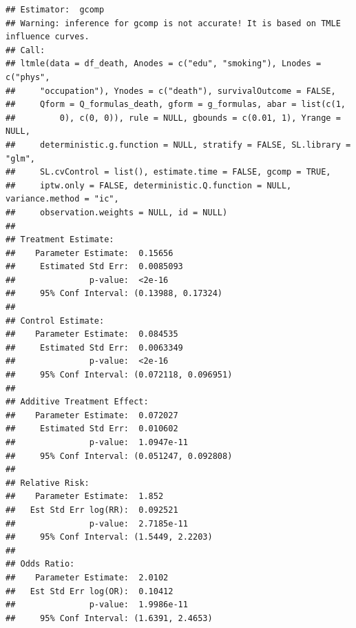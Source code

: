 \documentclass[
]{book}
\begin{document}
\begin{verbatim}
## Estimator:  gcomp 
## Warning: inference for gcomp is not accurate! It is based on TMLE influence curves.
## Call:
## ltmle(data = df_death, Anodes = c("edu", "smoking"), Lnodes = c("phys", 
##     "occupation"), Ynodes = c("death"), survivalOutcome = FALSE, 
##     Qform = Q_formulas_death, gform = g_formulas, abar = list(c(1, 
##         0), c(0, 0)), rule = NULL, gbounds = c(0.01, 1), Yrange = NULL, 
##     deterministic.g.function = NULL, stratify = FALSE, SL.library = "glm", 
##     SL.cvControl = list(), estimate.time = FALSE, gcomp = TRUE, 
##     iptw.only = FALSE, deterministic.Q.function = NULL, variance.method = "ic", 
##     observation.weights = NULL, id = NULL)
## 
## Treatment Estimate:
##    Parameter Estimate:  0.15656 
##     Estimated Std Err:  0.0085093 
##               p-value:  <2e-16 
##     95% Conf Interval: (0.13988, 0.17324) 
## 
## Control Estimate:
##    Parameter Estimate:  0.084535 
##     Estimated Std Err:  0.0063349 
##               p-value:  <2e-16 
##     95% Conf Interval: (0.072118, 0.096951) 
## 
## Additive Treatment Effect:
##    Parameter Estimate:  0.072027 
##     Estimated Std Err:  0.010602 
##               p-value:  1.0947e-11 
##     95% Conf Interval: (0.051247, 0.092808) 
## 
## Relative Risk:
##    Parameter Estimate:  1.852 
##   Est Std Err log(RR):  0.092521 
##               p-value:  2.7185e-11 
##     95% Conf Interval: (1.5449, 2.2203) 
## 
## Odds Ratio:
##    Parameter Estimate:  2.0102 
##   Est Std Err log(OR):  0.10412 
##               p-value:  1.9986e-11 
##     95% Conf Interval: (1.6391, 2.4653)
\end{verbatim}
\end{document}
